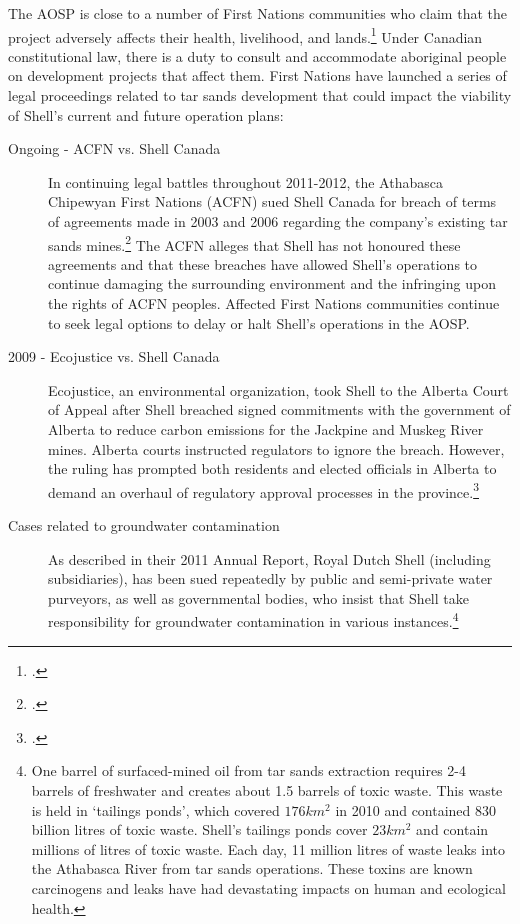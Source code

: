 The AOSP is close to a number of First Nations communities who claim that the project adversely affects their health, livelihood, and lands.\footcite[][]{RiskingRuin_2012}  
Under Canadian constitutional law, there is a duty to consult and accommodate aboriginal people on development projects that affect them.
First Nations have launched a series of legal proceedings related to tar sands development that could impact the viability of Shell's current and future operation plans:
\begin{description}
	\item [Ongoing - ACFN vs. Shell Canada] In continuing legal battles throughout 2011-2012, the Athabasca Chipewyan First Nations (ACFN) sued Shell Canada for breach of terms of agreements made in 2003 and 2006 regarding the company's existing tar sands mines.\footcite{FNSues} The ACFN alleges that Shell has not honoured these agreements and that these breaches have allowed Shell's operations to continue damaging the surrounding environment and the infringing upon the rights of ACFN peoples. Affected First Nations communities continue to seek legal options to delay or halt Shell's operations in the AOSP.
	\item [2009 - Ecojustice vs. Shell Canada] Ecojustice, an environmental organization, took Shell to the Alberta Court of Appeal after Shell breached signed commitments with the government of Alberta to reduce carbon emissions for the Jackpine and Muskeg River mines. Alberta courts instructed regulators to ignore the breach. However, the ruling has prompted both residents and elected officials in Alberta to demand an overhaul of regulatory approval processes in the province.\footcite[][]{RiskingRuin_2012}
	\item [Cases related to groundwater contamination] As described in their 2011 Annual Report, Royal Dutch Shell (including subsidiaries), has been sued repeatedly by public and semi-private water purveyors, as well as governmental bodies, who insist that Shell take responsibility for groundwater contamination in various instances.\footnote{One barrel of surfaced-mined oil from tar sands extraction requires 2-4 barrels of freshwater and creates about 1.5 barrels of toxic waste. This waste is held in `tailings ponds', which covered $176 km^2$ in 2010 and contained 830 billion litres of toxic waste. Shell's tailings ponds cover $23 km^2$ and contain millions of litres of toxic waste. Each day, 11 million litres of waste leaks into the Athabasca River from tar sands operations. These toxins are known carcinogens and leaks have had devastating impacts on human and ecological health.} 

\end{description}
